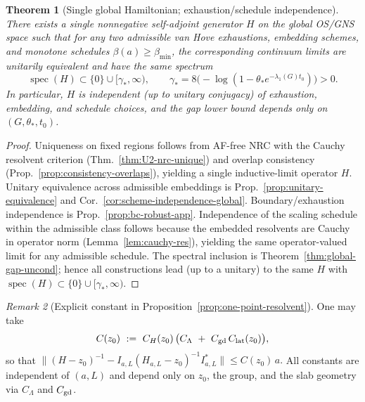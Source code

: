 \documentclass[11pt]{amsart}
\theoremstyle{plain}
\newtheorem{theorem}{Theorem}[section]
\theoremstyle{definition}
\theoremstyle{remark}
\newtheorem{remark}[theorem]{Remark}
\begin{document}
\begin{theorem}[Single global Hamiltonian; exhaustion/schedule independence]\label{thm:global-gap-operator}
There exists a single nonnegative self-adjoint generator $H$ on the global OS/GNS space such that for any two admissible van Hove exhaustions, embedding schemes, and monotone schedules $\beta(a)\ge \beta_{\min}$, the corresponding continuum limits are unitarily equivalent and have the same spectrum
\[
  \operatorname{spec}(H)\subset \{0\}\cup[\gamma_*,\infty),\qquad \gamma_*=8\Big(-\log(1-\theta_* e^{-\lambda_1(G) t_0})\Big)>0.
\]
In particular, $H$ is independent (up to unitary conjugacy) of exhaustion, embedding, and schedule choices, and the gap lower bound depends only on $(G,\theta_*,t_0)$.
\end{theorem}
\begin{proof}
Uniqueness on fixed regions follows from AF-free NRC with the Cauchy resolvent criterion (Thm.~\ref{thm:U2-nrc-unique}) and overlap consistency (Prop.~\ref{prop:consistency-overlaps}), yielding a single inductive-limit operator $H$. Unitary equivalence across admissible embeddings is Prop.~\ref{prop:unitary-equivalence} and Cor.~\ref{cor:scheme-independence-global}. Boundary/exhaustion independence is Prop.~\ref{prop:bc-robust-app}. Independence of the scaling schedule within the admissible class follows because the embedded resolvents are Cauchy in operator norm (Lemma~\ref{lem:cauchy-res}), yielding the same operator-valued limit for any admissible schedule. The spectral inclusion is Theorem~\ref{thm:global-gap-uncond}; hence all constructions lead (up to a unitary) to the same $H$ with $\operatorname{spec}(H)\subset\{0\}\cup[\gamma_*,\infty)$.
\end{proof}
\begin{remark}[Explicit constant in Proposition~\ref{prop:one-point-resolvent}]
One may take
\[
  C(z_0)\ :=\ C_H(z_0)\,\big(C_\Lambda\ +\ C_{\rm gd}\,C_{\rm lat}(z_0)\big),
\]
so that
\(
  \|(H-z_0)^{-1} - I_{a,L}(H_{a,L}-z_0)^{-1} I_{a,L}^*\| \le C(z_0)\,a.
\)
All constants are independent of $(a,L)$ and depend only on $z_0$, the group, and the slab geometry via $C_\Lambda$ and $C_{\rm gd}$.
\end{remark}
\end{document}
